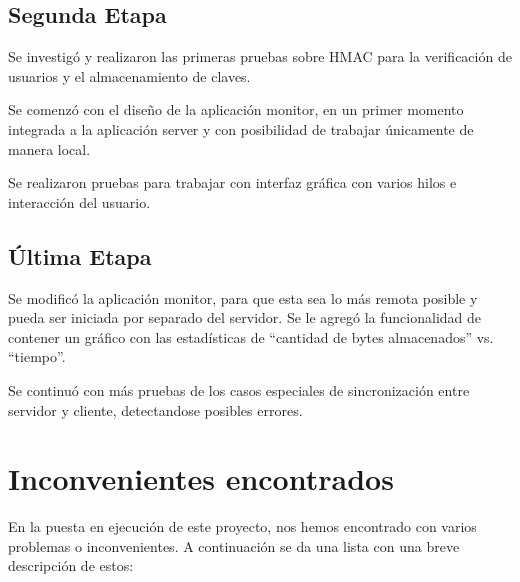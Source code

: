 \documentclass{article}
\begin{document}
\subsection{Segunda Etapa}
\smallskip

	Se investigó y realizaron las primeras pruebas sobre HMAC para la verificación de usuarios y el almacenamiento de claves.
	\par
	Se comenzó con el diseño de la aplicación monitor, en un primer momento integrada a la aplicación server y con posibilidad de trabajar únicamente de manera local.
	\par
	Se realizaron pruebas para trabajar con interfaz gráfica con varios hilos e interacción del usuario.

\subsection{Última Etapa}
\smallskip

	Se modificó la aplicación monitor, para que esta sea lo más remota posible y pueda ser iniciada por separado del servidor. Se le agregó la funcionalidad de contener un gráfico con las estadísticas de “cantidad de bytes almacenados” vs. “tiempo”.
	\par
	Se continuó con más pruebas de los casos especiales de sincronización entre servidor y cliente, detectandose posibles errores. 

\bigskip




\section{Inconvenientes encontrados}

	En la puesta en ejecución de este proyecto, nos hemos encontrado con varios problemas o inconvenientes. A continuación se da una lista con una breve descripción de estos:
\end{document}
